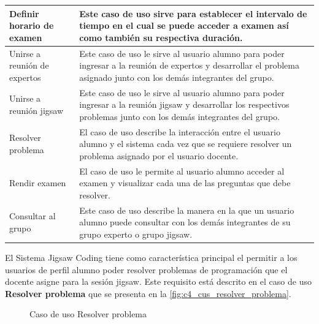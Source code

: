 \begin{longtable}{L{4cm}L{9cm}}
	\midrule
	Definir horario de examen & Este caso de uso sirve para establecer el intervalo de tiempo en el cual se puede acceder a examen así como también su respectiva duración.\\
	\midrule
	Unirse a reunión de expertos & Este caso de uso le sirve al usuario alumno para poder ingresar a la reunión de expertos y desarrollar el problema asignado junto con los demás integrantes del grupo.\\
	\midrule
	Unirse a reunión jigsaw & Este caso de uso le sirve al usuario alumno para poder ingresar a la reunión jigsaw y desarrollar los respectivos problemas junto con los demás integrantes del grupo. \\
	\midrule
	Resolver problema & El caso de uso describe la interacción entre el usuario alumno y el sistema cada vez que se requiere resolver un problema asignado por el usuario docente.\\
	\midrule
	Rendir examen & El caso de uso le permite al usuario alumno acceder al examen y visualizar cada una de las preguntas que debe resolver.\\
	\midrule
	Consultar al grupo & Este caso de uso describe la manera en la que un usuario alumno puede consultar con los demás integrantes de su grupo experto o grupo jigsaw.\\
	\bottomrule[0.8mm]
\end{longtable}

El Sistema Jigsaw Coding tiene como característica principal el permitir a los usuarios de perfil alumno poder resolver problemas de programación que el docente asigne para la sesión jigsaw. Este requisito está descrito en el caso de uso \textbf{Resolver problema} que se presenta en la \autoref{fig:c4_cus_resolver_problema}. 

\begin{figure}[h!]
	\centering
	
	\caption{Caso de uso Resolver problema}
	\label{fig:c4_cus_resolver_problema}
\end{figure}

